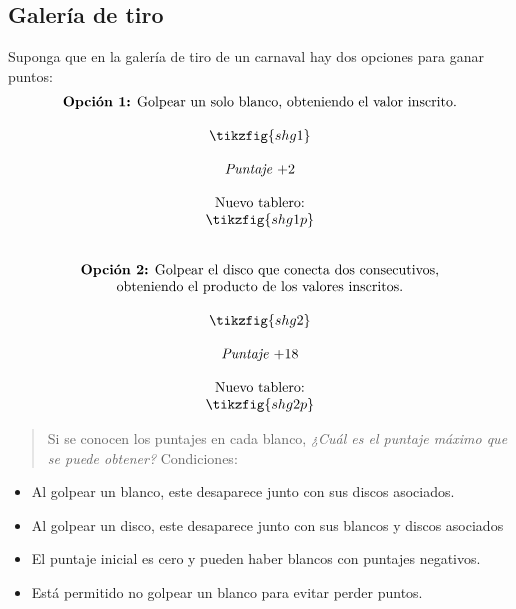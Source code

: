 \subsection{Galería de tiro}
Suponga que en la galería de tiro de un carnaval hay dos opciones para ganar
puntos:
\[
	\begin{array}{c}
		\mbox{\textbf{Opción 1:} Golpear un solo blanco, obteniendo
		el valor inscrito.}\\
		 \\
		\tikzfig{shg1}\\
		 \\
		 \mbox{\emph{Puntaje $+2$}}
		 \\
		 \\
		\mbox{Nuevo tablero:}\\
		\tikzfig{shg1p}\\
		 \\
		 \\
		\mbox{\textbf{Opción 2:} Golpear el disco que conecta dos
		consecutivos,}\\
		\mbox{obteniendo el producto de los valores
			inscritos.}\\ 
		 \\
		\tikzfig{shg2}\\
		 \\
		 \mbox{\emph{Puntaje $+18$}}\\
		 \\
		\mbox{Nuevo tablero:}\\
		\tikzfig{shg2p}
	\end{array}
\]
\bigskip
\begin{quote}
	Si se conocen los puntajes en cada blanco,
	\emph{¿Cuál es el puntaje máximo que se puede obtener?}
	Condiciones: 
\end{quote}
\begin{itemize}
	\item Al golpear un blanco, este desaparece junto con sus discos
		asociados.
	\item Al golpear un disco, este desaparece junto con sus blancos
		y discos asociados
	\item El puntaje inicial es cero y pueden haber blancos con puntajes
		negativos.
	\item Está permitido no golpear un blanco para evitar perder puntos.
\end{itemize}
